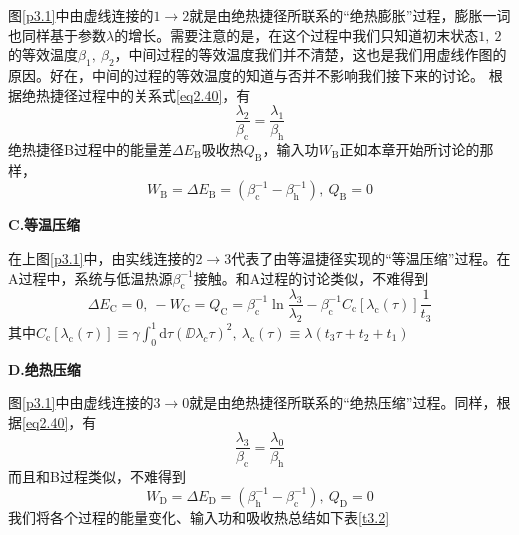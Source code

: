 图\ref{p3.1}中由虚线连接的$1 \to 2$就是由绝热捷径所联系的“绝热膨胀”过程，膨胀一词也同样基于参数$\lambda$的增长。需要注意的是，在这个过程中我们只知道初末状态$1,\ 2$的等效温度$\beta_1 ,\ \beta_2$，中间过程的等效温度我们并不清楚，这也是我们用虚线作图的原因。好在，中间的过程的等效温度的知道与否并不影响我们接下来的讨论。
根据绝热捷径过程中的关系式\eqref{eq2.40}，有
\begin{equation}
    \frac{\lambda_2}{\beta_{\mathrm{c}}} =\frac{\lambda_1}{\beta_{\mathrm{h}}}
    \label{eq3.16.5}
\end{equation}
绝热捷径B过程中的能量差$\Delta E_{\mathrm{B}}$吸收热$Q_{\mathrm{B}}$，输入功$W_{\mathrm{B}}$正如本章开始所讨论的那样，
\begin{equation}
    W_{\mathrm{B}} = \Delta E_{\mathrm{B}} = (\beta_{\mathrm{c}}^{-1} - \beta_{\mathrm{h}}^{-1}),\  Q_{\mathrm{B}}=0
    \label{eq3.17}
\end{equation}

\begin{center}
    {\bfseries C.等温压缩}
\end{center}

在上图\ref{p3.1}中，由实线连接的$2 \to 3$代表了由等温捷径实现的“等温压缩”过程。在A过程中，系统与低温热源$\beta_\mathrm{c}^{-1}$接触。和A过程的讨论类似，不难得到
\begin{equation}
    \Delta E_{\mathrm{C}}=0,\ -W_{\mathrm{C}}=Q_{\mathrm{C}} = \beta_{\mathrm{c}}^{-1} \ln{\frac{\lambda_3}{\lambda_2}} - \beta_{\mathrm{c}}^{-1} C_{\mathrm{c}} [\lambda_{\mathrm{c}}(\tau)] \frac{1}{t_3}
    \label{eq3.18}
\end{equation}
其中$C_{\mathrm{c}} [\lambda_{\mathrm{c}}(\tau)]\equiv \gamma \int_{0}^{1} \mathrm{d} \tau    \left(\DD{\lambda_{c}}{\tau}\right)^2,\ \lambda_{\mathrm{c}}(\tau)\equiv\lambda(t_3 \tau + t_2 +t_1)$
\begin{center}
    {\bfseries D.绝热压缩}
\end{center}

图\ref{p3.1}中由虚线连接的$3 \to 0$就是由绝热捷径所联系的“绝热压缩”过程。同样，根据\eqref{eq2.40}，有
\begin{equation}
    \frac{\lambda_3}{\beta_{\mathrm{c}}} =\frac{\lambda_0}{\beta_{\mathrm{h}}}
    \label{eq3.18.5}
\end{equation}
而且和B过程类似，不难得到
\begin{equation}
    W_{\mathrm{D}} = \Delta E_{\mathrm{D}} = (\beta_{\mathrm{h}}^{-1} - \beta_{\mathrm{c}}^{-1}),\  Q_{\mathrm{D}}=0
    \label{eq3.19}
\end{equation}
我们将各个过程的能量变化、输入功和吸收热总结如下表\ref{t3.2}

